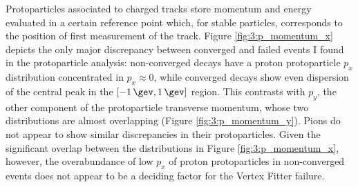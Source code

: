 Protoparticles associated to charged tracks store momentum and energy evaluated in a certain reference point which, for stable particles, corresponds to the position of first measurement of the track.
Figure \ref{fig:3:p_momentum_x} depicts the only major discrepancy between converged and failed events I found in the protoparticle analysis:
non-converged \lbz decays have a proton protoparticle $p_x$ distribution concentrated in $p_x \approx 0$, while converged decays show even dispersion of the central peak in the $[-\SI{1}{\gev},\SI{1}{\gev}]$ region.
This contrasts with $p_y$, the other component of the protoparticle transverse momentum, whose two distributions are almost overlapping (Figure \ref{fig:3:p_momentum_y}).
Pions do not appear to show similar discrepancies in their protoparticles.
Given the significant overlap between the distributions in Figure \ref{fig:3:p_momentum_x}, however, the overabundance of low $p_x$ of proton protoparticles in non-converged events does not appear to be a deciding factor for the Vertex Fitter failure.


%
%
%
%
%
%
%

